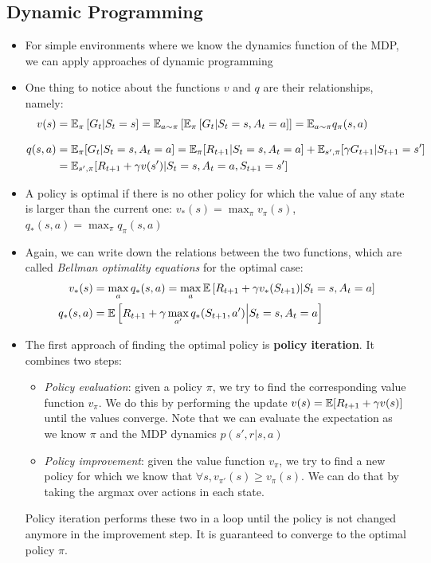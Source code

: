 \subsection{Dynamic Programming}
\begin{itemize}
	\item For simple environments where we know the dynamics function of the MDP, we can apply approaches of dynamic programming
	\item One thing to notice about the functions $v$ and $q$ are their relationships, namely:
	\begin{equation*}
		\begin{split}
			v(s) & = \mathbb{E}_{\pi}\left[G_t|S_t=s\right] = \mathbb{E}_{a\sim\pi}\left[\mathbb{E}_{\pi}\left[G_t|S_t=s,A_t=a\right]\right] = \mathbb{E}_{a\sim\pi} q_{\pi}(s,a)\\[8pt]
			q(s,a) & = \mathbb{E}_{\pi}[G_t|S_t=s,A_t=a] = \mathbb{E}_{\pi}[R_{t+1}|S_t=s,A_t=a]+\mathbb{E}_{s',\pi}[\gamma G_{t+1}|S_{t+1}=s'] \\& = \mathbb{E}_{s',\pi}[R_{t+1}+\gamma v(s')|S_t=s,A_t=a,S_{t+1}=s']
		\end{split}
	\end{equation*}
	\item A policy is optimal if there is no other policy for which the value of any state is larger than the current one: $v_{*}(s)=\max_{\pi} v_{\pi}(s)$, $q_{*}(s,a)=\max_{\pi} q_{\pi}(s,a)$
	\item Again, we can write down the relations between the two functions, which are called \textit{Bellman optimality equations} for the optimal case:
	\begin{equation*}
		\begin{split}
			v_{*}(s) & =\max_{a}q_{*}(s,a)= \max_a \mathbb{E}\left[R_{t+1}+\gamma v_{*}(S_{t+1})|S_t=s,A_t=a\right]\\
			q_{*}(s,a) & = \mathbb{E}\left[R_{t+1}+\gamma \max_{a'} q_{*}(S_{t+1},a')\Big\vert S_t=s,A_t=a\right]
		\end{split}
	\end{equation*}
	
	\item The first approach of finding the optimal policy is \textbf{policy iteration}. It combines two steps:
	\begin{itemize}
		\item \textit{Policy evaluation}: given a policy $\pi$, we try to find the corresponding value function $v_{\pi}$. We do this by performing the update $v(s)=\mathbb{E}[R_{t+1}+\gamma v(s)]$ until the values converge. Note that we can evaluate the expectation as we know $\pi$ and the MDP dynamics $p(s',r|s,a)$
		\item \textit{Policy improvement}: given the value function $v_{\pi}$, we try to find a new policy for which we know that $\forall s, v_{\pi'}(s)\geq v_{\pi}(s)$. We can do that by taking the argmax over actions in each state.
	\end{itemize}
	Policy iteration performs these two in a loop until the policy is not changed anymore in the improvement step. It is guaranteed to converge to the optimal policy $\pi$.
	

\end{itemize}
